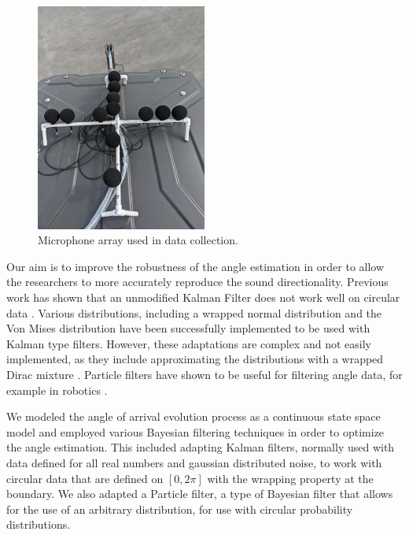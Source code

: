 \documentclass[11pt]{amsart}
\begin{document}
\begin{figure}[htp]
\includegraphics*[width=0.5\textwidth]{Pic of Real Mic Array.jpg}\hfill
\caption{Microphone array used in data collection.}
\label{fig:array}
\end{figure}

Our aim is to improve the robustness of the angle estimation in order to allow the researchers to more accurately reproduce the sound directionality. Previous work has shown that an unmodified Kalman Filter does not work well on circular data \cite{Research}. Various distributions, including a wrapped normal distribution and the Von Mises distribution have been successfully implemented to be used with Kalman type filters. However, these adaptations are complex and not easily implemented, as they include approximating the distributions with a wrapped Dirac mixture \cite{Research}. Particle filters have shown to be useful for filtering angle data, for example in robotics \cite{Oops}.

We modeled the angle of arrival evolution process as a continuous state space model and employed various Bayesian filtering techniques in order to optimize the angle estimation. This included adapting Kalman filters, normally used with data defined for all real numbers and gaussian distributed noise, to work with circular data that are defined on $[0,2\pi]$ with the wrapping property at the boundary. We also adapted a Particle filter, a type of Bayesian filter that allows for the use of an arbitrary distribution, for use with circular probability distributions.

\end{document}
